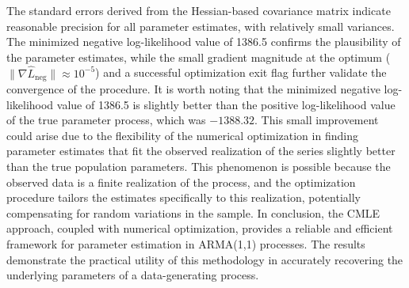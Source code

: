 \documentclass[a4paper,12pt]{article}
\begin{document}
The standard errors derived from the Hessian-based covariance matrix indicate reasonable precision for all parameter estimates, with relatively small variances. The minimized negative log-likelihood value of 1386.5 confirms the plausibility of the parameter estimates, while the small gradient magnitude at the optimum (\(\|\nabla \hat{L}_{\text{neg}}\| \approx 10^{-5}\)) and a successful optimization exit flag further validate the convergence of the procedure. It is worth noting that the minimized negative log-likelihood value of 1386.5 is slightly better than the positive log-likelihood value of the true parameter process, which was \(-1388.32\). This small improvement could arise due to the flexibility of the numerical optimization in finding parameter estimates that fit the observed realization of the series slightly better than the true population parameters. This phenomenon is possible because the observed data is a finite realization of the process, and the optimization procedure tailors the estimates specifically to this realization, potentially compensating for random variations in the sample.
In conclusion, the CMLE approach, coupled with numerical optimization, provides a reliable and efficient framework for parameter estimation in ARMA(1,1) processes. The results demonstrate the practical utility of this methodology in accurately recovering the underlying parameters of a data-generating process.
\end{document}
